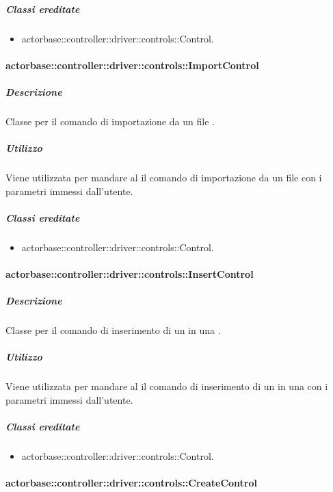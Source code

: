 \documentclass{scalatekids-article}
\begin{document}
\subparagraph{Classi ereditate}

\begin{itemize}
\item actorbase::controller::driver::controls::Control.
\end{itemize}

\paragraph{actorbase::controller::driver::controls::ImportControl}

\subparagraph{Descrizione}

Classe per il comando di importazione da un file .

\subparagraph{Utilizzo}

Viene utilizzata per mandare al  il comando di importazione da un file  con i parametri immessi dall'utente.

\subparagraph{Classi ereditate}

\begin{itemize}
\item actorbase::controller::driver::controls::Control.
\end{itemize}

\paragraph{actorbase::controller::driver::controls::InsertControl}

\subparagraph{Descrizione}

Classe per il comando di inserimento di un  in una .

\subparagraph{Utilizzo}

Viene utilizzata per mandare al  il comando di inserimento di un  in una  con i parametri immessi dall'utente.

\subparagraph{Classi ereditate}

\begin{itemize}
\item actorbase::controller::driver::controls::Control.
\end{itemize}

\paragraph{actorbase::controller::driver::controls::CreateControl}
\end{document}
